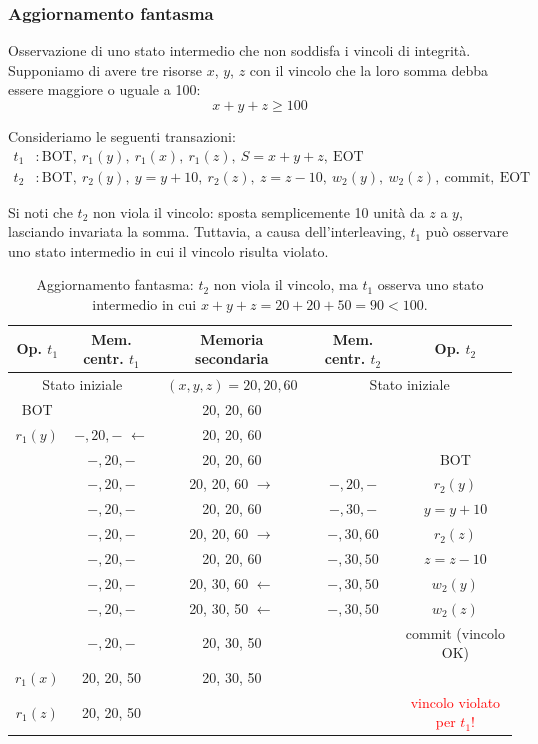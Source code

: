 \subsubsection{Aggiornamento fantasma}

Osservazione di uno stato intermedio che non soddisfa i vincoli di integrità. Supponiamo di avere tre risorse $x$, $y$, $z$ con il vincolo che la loro somma debba essere maggiore o uguale a 100:
\[
x + y + z \geq 100
\]

Consideriamo le seguenti transazioni:
\begin{align*}
	t_1 &: \text{BOT},\ r_1(y),\ r_1(x),\ r_1(z),\ S = x+y+z,\ \text{EOT} \\
	t_2 &: \text{BOT},\ r_2(y),\ y = y+10,\ r_2(z),\ z = z-10,\ w_2(y),\ w_2(z),\ \text{commit},\ \text{EOT}
\end{align*}

Si noti che $t_2$ non viola il vincolo: sposta semplicemente 10 unità da $z$ a $y$, lasciando invariata la somma. Tuttavia, a causa dell'interleaving, $t_1$ può osservare uno stato intermedio in cui il vincolo risulta violato.

\begin{table}[H]
	\centering
	\begin{tabular}{|c|c|c|c|c|}
		\hline
		\textbf{Op. $t_1$} & \textbf{Mem. centr. $t_1$} & \textbf{Memoria secondaria} & \textbf{Mem. centr. $t_2$} & \textbf{Op. $t_2$} \\
		\hline
		\multicolumn{2}{|c|}{Stato iniziale} & $(x,y,z) = 20, 20, 60$ & \multicolumn{2}{c|}{Stato iniziale} \\
		\hline
		BOT & & 20, 20, 60 & & \\
		\hline
		$r_1(y)$ & $-,20,-$ $\leftarrow$ & 20, 20, 60 & & \\
		\hline
		& $-,20,-$ & 20, 20, 60 & & BOT \\
		\hline
		& $-,20,-$ & 20, 20, 60 $\rightarrow$ & $-,20,-$ & $r_2(y)$ \\
		\hline
		& $-,20,-$ & 20, 20, 60 & $-,30,-$ & $y = y+10$ \\
		\hline
		& $-,20,-$ & 20, 20, 60 $\rightarrow$ & $-,30,60$ & $r_2(z)$ \\
		\hline
		& $-,20,-$ & 20, 20, 60 & $-,30,50$ & $z = z-10$ \\
		\hline
		& $-,20,-$ & 20, 30, 60 $\leftarrow$ & $-,30,50$ & $w_2(y)$ \\
		\hline
		& $-,20,-$ & \cellcolor{yellow!40}20, 30, 50 $\leftarrow$ & $-,30,50$ & $w_2(z)$ \\
		\hline
		& $-,20,-$ & \cellcolor{yellow!40}20, 30, 50 & & commit \textcolor{green!50!black}{(vincolo OK)} \\
		\hline
		\rowcolor{red!15}
		$r_1(x)$ & 20, 20, 50 & \cellcolor{yellow!40}20, 30, 50 & & \\
		\hline
		\rowcolor{red!15}
		$r_1(z)$ & 20, 20, 50 &  & & \textcolor{red}{vincolo violato per $t_1$!} \\
		\hline
	\end{tabular}
	\caption{Aggiornamento fantasma: $t_2$ non viola il vincolo, ma $t_1$ osserva uno stato intermedio in cui $x + y + z = 20 + 20 + 50 = 90 < 100$.}
\end{table}
